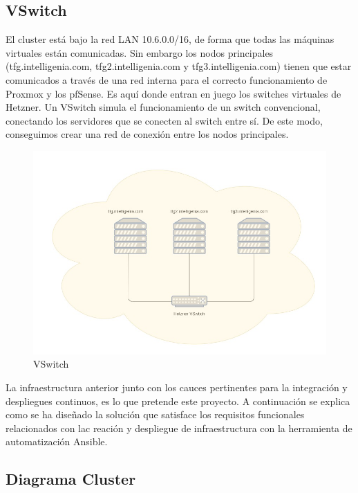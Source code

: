 \subsection{VSwitch}
\begin{text}
	El cluster está bajo la red LAN 10.6.0.0/16, de forma que todas las máquinas virtuales están comunicadas. Sin embargo los nodos principales (tfg.intelligenia.com, tfg2.intelligenia.com y tfg3.intelligenia.com) tienen que estar comunicados a través de una red interna para el correcto funcionamiento de Proxmox y los pfSense.
	Es aquí donde entran en juego los switches virtuales de Hetzner. Un VSwitch simula el funcionamiento de un switch convencional, conectando los servidores que se conecten al switch entre sí. De este modo, conseguimos crear una red de conexión entre los nodos principales.
	
	\begin{figure}[!hbt]
		\centering
		\includegraphics[scale=0.4]{imagenes/Analisis/vswitch.jpg}
		\caption[VSwitch]{VSwitch}
		\label{VSwitch}
	\end{figure}
\end{text}

\begin{text}
	La infraestructura anterior junto con los cauces pertinentes para la integración y despliegues continuos, es lo que pretende este proyecto. A continuación se explica como se ha diseñado la solución que satisface los requisitos funcionales relacionados con lac reación y despliegue de infraestructura con la herramienta de automatización Ansible.
\end{text}
\clearpage

\subsection{Diagrama Cluster}
\label{diagrama_cluster_}

